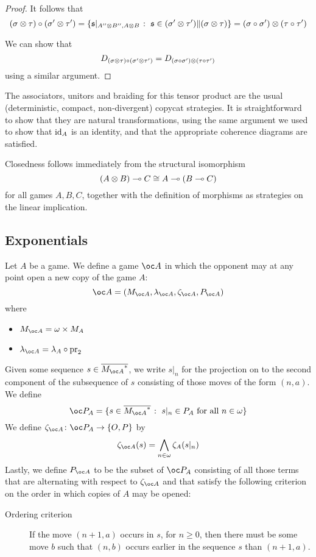 \documentclass{article}
\begin{document}
\begin{proposition}
\begin{proof}
    It follows that
    \[
      (\sigma\otimes\tau) \circ (\sigma'\otimes\tau')
      = \left\{\mathfrak s\vert_{A''\otimes B'', A\otimes B}\;\colon\;\mathfrak s\in(\sigma'\otimes\tau')\|(\sigma\otimes\tau)\right\}
      = (\sigma \circ \sigma')\otimes(\tau \circ \tau')
      \]

    We can show that
    \[
      D_{(\sigma\otimes\tau) \circ (\sigma'\otimes\tau')} = D_{(\sigma \circ \sigma')\otimes(\tau \circ \tau')}
      \]
    using a similar argument.
  \end{proof}
\end{proposition}

The associators, unitors and braiding for this tensor product are the usual (deterministic, compact, non-divergent) copycat strategies.  It is straightforward to show that they are natural transformations, using the same argument we used to show that $\operatorname{id}_A$ is an identity, and that the appropriate coherence diagrams are satisfied.  

Closedness follows immediately from the structural isomorphism
\[
  (A \otimes B) \multimap C \cong A \multimap (B \multimap C)
  \]
for all games $A,B,C$, together with the definition of morphisms as strategies on the linear implication.

\subsection{Exponentials}

Let $A$ be a game.  We define a game $\oc A$ in which the opponent may at any point open a new copy of the game $A$:
\[
  \oc A = (M_{\oc A}, \lambda_{\oc A}, \zeta_{\oc A}, P_{\oc A})
  \]
where
\begin{itemize}
  \item $M_{\oc A} = \omega \times M_A$
  \item $\lambda_{\oc A} = \lambda_A \circ \pr_2$
\end{itemize}

Given some sequence $s\in \seqs{M_{\oc A}}$, we write $s\vert_n$ for the projection on to the second component of the subsequence of $s$ consisting of those moves of the form $(n, a)$.  We define
\[
  \oc P_A = \{s\in\seqs{M_{\oc A}} \suchthat s\vert_n\in P_A \textrm{ for all $n\in\omega$}\}
  \]
We define $\zeta_{\oc A}\from \oc P_A\to\OP$ by
\[
  \zeta_{\oc A}(s) = \bigwedge_{n\in\omega}\zeta_A(s\vert_n)
  \]
Lastly, we define $P_{\oc A}$ to be the subset of $\oc P_A$ consisting of all those terms that are alternating with respect to $\zeta_{\oc A}$ and that satisfy the following criterion on the order in which copies of $A$ may be opened:
\begin{description}
  \item[Ordering criterion] If the move $(n + 1, a)$ occurs in $s$, for $n\ge 0$, then there must be some move $b$ such that $(n, b)$ occurs earlier in the sequence $s$ than $(n + 1, a)$.  
\end{description}
\end{document}
